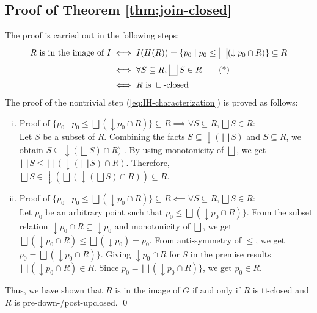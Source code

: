 \documentclass{llncs}
\newcommand{\join}{\sqcup}
\newcommand{\bigjoin}{\bigsqcup}
\begin{document}
\subsection{Proof of Theorem \ref{thm:join-closed}}
The proof is carried out in the following steps:
\begin{align}
  R \text{ is in the image of } I &\iff I(H(R)) = \{ p_{0} \mid p_{0} \leq \bigjoin (\downarrow p_{0} \cap R) \} \subseteq R \notag\\
                                  &\iff \forall S \subseteq R, \bigjoin S \in R \tag{*}\label{eq:IH-characterization}  \\
                                  &\iff R \text{ is }\join \text{-closed } \notag
\end{align}
The proof of the nontrivial step (\ref{eq:IH-characterization}) is proved as follows:
\begin{enumerate}[i.]
\item{Proof of $ \{ p_{0} \mid p_{0} \leq \bigjoin (\downarrow p_{0} \cap R) \} \subseteq R \implies \forall S \subseteq R, \bigjoin S \in R$}:\\
Let $S$ be a subset of $R$. Combining the facts $S \subseteq \downarrow (\bigjoin S)$ and $S \subseteq R$, we obtain $S \subseteq \downarrow (\bigjoin S) \cap R)$ . By using monotonicity of $\bigjoin$, we get $\bigjoin S \leq \bigjoin (\downarrow (\bigjoin S) \cap R)$. Therefore, $\bigjoin S \in \downarrow (\bigjoin (\downarrow (\bigjoin S) \cap R)) \subseteq R$.
\item{Proof of $ \{ p_{0} \mid p_{0} \leq \bigjoin (\downarrow p_{0} \cap R) \} \subseteq R \impliedby \forall S \subseteq R, \bigjoin S \in R$:}\\
Let $p_0$ be an arbitrary point such that $p_{0} \leq \bigjoin (\downarrow p_{0} \cap R) \}$.
From the subset relation $\downarrow p_{0} \cap R \subseteq \downarrow p_{0}$ and monotonicity of $\bigjoin$, we get $\bigjoin (\downarrow p_{0} \cap R) \leq \bigjoin (\downarrow p_{0}) = p_{0}$. From anti-symmetry of $\leq$, we get $p_{0} = \bigjoin (\downarrow p_{0} \cap R) \}$.
Giving $\downarrow p_{0} \cap R$ for $S$ in the premise results $\bigjoin (\downarrow p_{0} \cap R) \in R$. Since $p_{0} = \bigjoin (\downarrow p_{0} \cap R) \}$, we get $p_{0} \in R$.
\end{enumerate}
Thus, we have shown that $R$ is in the image of $G$ if and only if $R$ is $\join$-closed and $R$ is pre-down-/post-upclosed.
\qed
\end{document}
